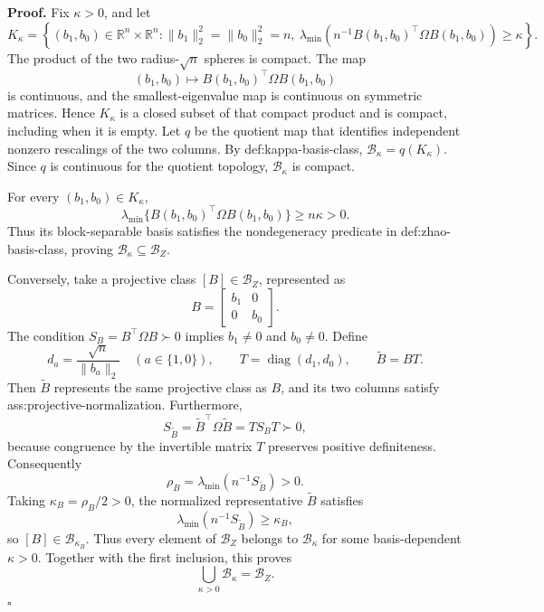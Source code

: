 \textbf{Proof.}
Fix \(\kappa>0\), and let
\[
K_\kappa=\left\{(b_1,b_0)\in\mathbb R^n\times\mathbb R^n:
\lVert b_1\rVert_2^2=\lVert b_0\rVert_2^2=n,\ 
\lambda_{\min}\!\left(n^{-1}B(b_1,b_0)^{\top}\Omega B(b_1,b_0)\right)\ge\kappa
\right\}.
\]
The product of the two radius-\(\sqrt n\) spheres is compact.  The map
\[
(b_1,b_0)\longmapsto B(b_1,b_0)^{\top}\Omega B(b_1,b_0)
\]
is continuous, and the smallest-eigenvalue map is continuous on symmetric matrices.  Hence \(K_\kappa\) is a closed subset of that compact product and is compact, including when it is empty.  Let \(q\) be the quotient map that identifies independent nonzero rescalings of the two columns.  By def:kappa-basis-class, \(\mathcal B_\kappa=q(K_\kappa)\).  Since \(q\) is continuous for the quotient topology, \(\mathcal B_\kappa\) is compact.

For every \((b_1,b_0)\in K_\kappa\),
\[
\lambda_{\min}\{B(b_1,b_0)^{\top}\Omega B(b_1,b_0)\}
\ge n\kappa>0.
\]
Thus its block-separable basis satisfies the nondegeneracy predicate in def:zhao-basis-class, proving \(\mathcal B_\kappa\subseteq\mathcal B_Z\).

Conversely, take a projective class \([B]\in\mathcal B_Z\), represented as
\[
B=\begin{bmatrix}b_1&0\\0&b_0\end{bmatrix}.
\]
The condition \(S_B=B^{\top}\Omega B\succ0\) implies \(b_1\ne0\) and \(b_0\ne0\).  Define
\[
d_a=\frac{\sqrt n}{\lVert b_a\rVert_2}\quad(a\in\{1,0\}),
\qquad T=\operatorname{diag}(d_1,d_0),
\qquad \widetilde B=BT.
\]
Then \(\widetilde B\) represents the same projective class as \(B\), and its two columns satisfy ass:projective-normalization.  Furthermore,
\[
S_{\widetilde B}=\widetilde B^{\top}\Omega\widetilde B
=T S_B T\succ0,
\]
because congruence by the invertible matrix \(T\) preserves positive definiteness.  Consequently
\[
\rho_B=\lambda_{\min}(n^{-1}S_{\widetilde B})>0.
\]
Taking \(\kappa_B=\rho_B/2>0\), the normalized representative \(\widetilde B\) satisfies
\[
\lambda_{\min}(n^{-1}S_{\widetilde B})\ge\kappa_B,
\]
so \([B]\in\mathcal B_{\kappa_B}\).  Thus every element of \(\mathcal B_Z\) belongs to \(\mathcal B_\kappa\) for some basis-dependent \(\kappa>0\).  Together with the first inclusion, this proves
\[
\bigcup_{\kappa>0}\mathcal B_\kappa=\mathcal B_Z.
\]
\(\square\)
